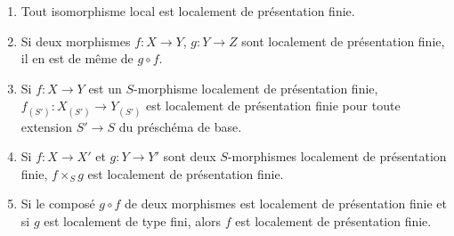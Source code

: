 \begin{proposition}[1.4.3]
\label{IV.1.4.3-fr}
\begin{enumerate}
  \item[\textup{(i)}] Tout isomorphisme local est localement de présentation finie.
  \item[\textup{(ii)}] Si deux morphismes $f:X\to Y$, $g:Y\to Z$ sont localement de
  présentation finie, il en est de même de $g\circ f$.


  \item[\textup{(iii)}] Si $f:X\to Y$ est un $S$-morphisme localement de présentation
  finie, $f_{(S')}:X_{(S')}\to Y_{(S')}$ est localement de présentation finie
  pour toute extension $S'\to S$ du préschéma de base.
  \item[\textup{(iv)}] Si $f:X\to X'$ et $g:Y\to Y'$ sont deux $S$-morphismes
  localement de présentation finie, $f\times_Sg$ est localement de
  présentation finie.
  \item[\textup{(v)}] Si le composé $g\circ f$ de deux morphismes est localement de
  présentation finie et si $g$ est localement de type fini, alors $f$ est
  localement de présentation finie.
\end{enumerate}
\end{proposition}

